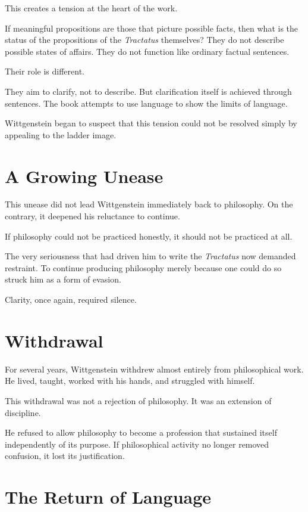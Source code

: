 \documentclass[11pt]{article}
\begin{document}
This creates a tension at the heart of the work.

If meaningful propositions are those that picture possible facts, then what is the status of the propositions of the \emph{Tractatus} themselves? They do not describe possible states of affairs. They do not function like ordinary factual sentences.

Their role is different.

They aim to clarify, not to describe. But clarification itself is achieved through sentences. The book attempts to use language to show the limits of language.

Wittgenstein began to suspect that this tension could not be resolved simply by appealing to the ladder image.

\section*{A Growing Unease}

This unease did not lead Wittgenstein immediately back to philosophy. On the contrary, it deepened his reluctance to continue.

If philosophy could not be practiced honestly, it should not be practiced at all.

The very seriousness that had driven him to write the \emph{Tractatus} now demanded restraint. To continue producing philosophy merely because one could do so struck him as a form of evasion.

Clarity, once again, required silence.

\section*{Withdrawal}

For several years, Wittgenstein withdrew almost entirely from philosophical work. He lived, taught, worked with his hands, and struggled with himself.

This withdrawal was not a rejection of philosophy. It was an extension of discipline.

He refused to allow philosophy to become a profession that sustained itself independently of its purpose. If philosophical activity no longer removed confusion, it lost its justification.

\section*{The Return of Language}
\end{document}

